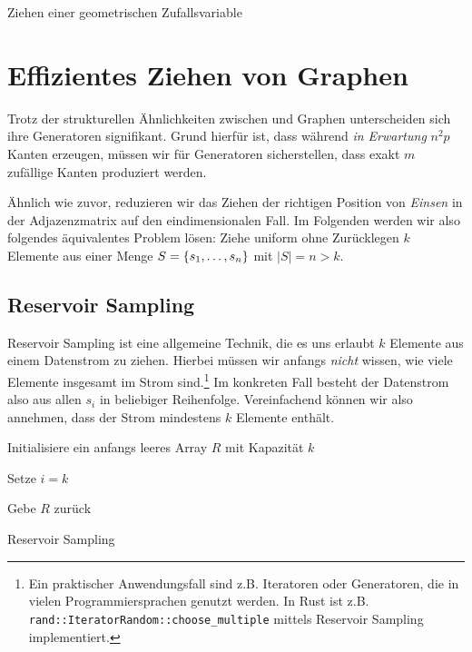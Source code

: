\begin{algorithm}[H]
    \Else{$U \gets \text{ziehen uniform aus $[0, 1)$}$\;
    Gebe $\log_{1-p}(1 - U) - 1$ zurück.}
    \caption{Ziehen einer geometrischen Zufallsvariable}
    \label{alg:sample-geometric}
\end{algorithm}

\bigskip
\bigskip

\section{Effizientes Ziehen von \Gnm Graphen}
Trotz der strukturellen Ähnlichkeiten zwischen \Gnp und \Gnm Graphen unterscheiden sich ihre Generatoren signifikant.
Grund hierfür ist, dass während \Gnp \emph{in Erwartung} $n^2p$ Kanten erzeugen, müssen wir für \Gnm Generatoren sicherstellen, dass exakt $m$ zufällige Kanten produziert werden.

Ähnlich wie zuvor, reduzieren wir das Ziehen der richtigen Position von \emph{Einsen} in der Adjazenzmatrix auf den eindimensionalen Fall.
Im Folgenden werden wir also folgendes äquivalentes Problem lösen:
Ziehe uniform ohne Zurücklegen $k$ Elemente aus einer Menge $S = \left\{s_1, \ldots, s_n\right\}$ mit $|S| = n > k$.

\clearpage

\subsection{Reservoir Sampling}
Reservoir Sampling ist eine allgemeine Technik, die es uns erlaubt $k$ Elemente aus einem Datenstrom zu ziehen.
Hierbei müssen wir anfangs \emph{nicht} wissen, wie viele Elemente insgesamt im Strom sind.\footnote{
    Ein praktischer Anwendungsfall sind z.B. Iteratoren oder Generatoren, die in vielen Programmiersprachen genutzt werden.
    In Rust ist z.B. \texttt{rand::IteratorRandom::choose\_multiple} mittels Reservoir Sampling implementiert.
}
Im konkreten Fall besteht der Datenstrom also aus allen $s_i$ in beliebiger Reihenfolge.
Vereinfachend können wir also annehmen, dass der Strom mindestens $k$ Elemente enthält.

\begin{algorithm}[H]

    Initialisiere ein anfangs leeres Array $R$ mit Kapazität $k$\;


    Setze $i = k$\;

    Gebe $R$ zurück

    \caption{Reservoir Sampling}
    \label{algo:reservoir-sampling}
\end{algorithm}

